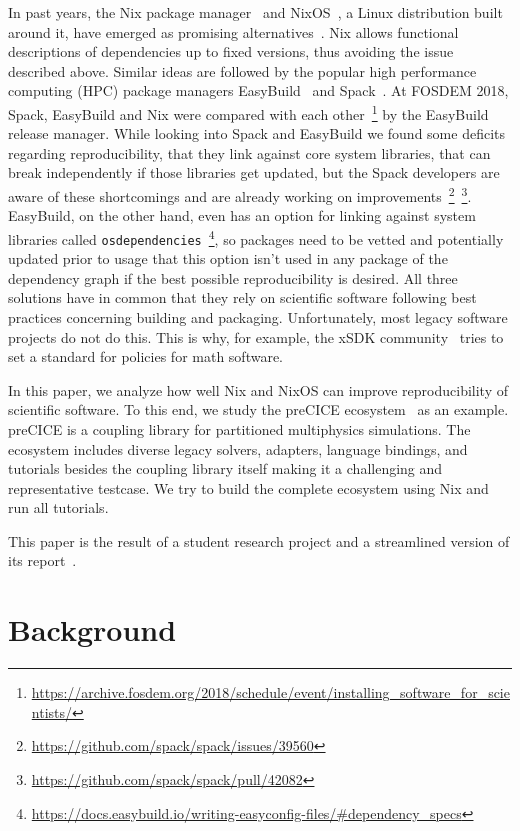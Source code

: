\documentclass{eceasst}
\begin{document}
In past years, the Nix package manager~\cite{Dolstra_2004} and NixOS~\cite{Dolstra_2010}, a Linux distribution built around it, have emerged as promising alternatives~\cite{Devresse_2015}.
Nix allows functional descriptions of dependencies up to fixed versions, thus avoiding the issue described above.
Similar ideas are followed by the popular high performance computing (HPC) package managers EasyBuild~\cite{easybuil6495863} and Spack~\cite{spack7832814}.
At FOSDEM 2018, Spack, EasyBuild and Nix were compared with each other~\footnote{\url{https://archive.fosdem.org/2018/schedule/event/installing\_software\_for\_scientists/}} by the EasyBuild release manager.
While looking into Spack and EasyBuild we found some deficits regarding reproducibility, that they link against core system libraries, that can break independently if those libraries get updated, but the Spack developers are aware of these shortcomings and are already working on improvements~\footnote{\url{https://github.com/spack/spack/issues/39560}}~\footnote{\url{https://github.com/spack/spack/pull/42082}}.
EasyBuild, on the other hand, even has an option for linking against system libraries called \texttt{osdependencies}~\footnote{\url{https://docs.easybuild.io/writing-easyconfig-files/\#dependency\_specs}}, so packages need to be vetted and potentially updated prior to usage that this option isn't used in any package of the dependency graph if the best possible reproducibility is desired.
All three solutions have in common that they rely on scientific software following best practices concerning building and packaging.
Unfortunately, most legacy software projects do not do this.
This is why, for example, the xSDK community~\cite{xSDK2023} tries to set a standard for policies for math software.

In this paper, we analyze how well Nix and NixOS can improve reproducibility of scientific software.
To this end, we study the preCICE ecosystem~\cite{preCICEv2} as an example.
preCICE is a coupling library for partitioned multiphysics simulations.
The ecosystem includes diverse legacy solvers, adapters, language bindings, and tutorials besides the coupling library itself making it a challenging and representative testcase.
We try to build the complete ecosystem using Nix and run all tutorials.

This paper is the result of a student research project and a streamlined version of its report~\cite{studentreport}.

\section{Background}
\end{document}
